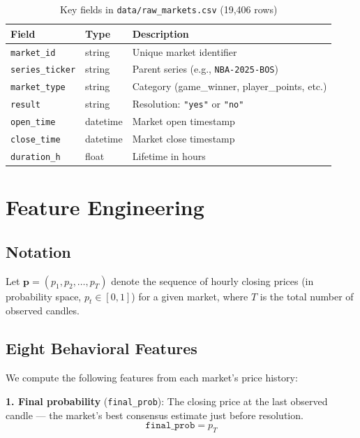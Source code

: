 \documentclass[11pt, a4paper]{article}
\begin{document}
\begin{table}[h!]
\centering
\caption{Key fields in \texttt{data/raw\_markets.csv} (19,406 rows)}
\begin{tabular}{lll}
\toprule
Field & Type & Description \\
\midrule
\texttt{market\_id} & string & Unique market identifier \\
\texttt{series\_ticker} & string & Parent series (e.g., \texttt{NBA-2025-BOS}) \\
\texttt{market\_type} & string & Category (game\_winner, player\_points, etc.) \\
\texttt{result} & string & Resolution: \texttt{"yes"} or \texttt{"no"} \\
\texttt{open\_time} & datetime & Market open timestamp \\
\texttt{close\_time} & datetime & Market close timestamp \\
\texttt{duration\_h} & float & Lifetime in hours \\
\bottomrule
\end{tabular}
\end{table}

\section{Feature Engineering}

\subsection{Notation}
Let $\mathbf{p} = (p_1, p_2, \ldots, p_T)$ denote the sequence of hourly closing prices (in probability space, $p_t \in [0,1]$) for a given market, where $T$ is the total number of observed candles.

\subsection{Eight Behavioral Features}

We compute the following features from each market's price history:

\vspace{0.5em}

\noindent\textbf{1. Final probability} (\texttt{final\_prob}): The closing price at the last observed candle — the market's best consensus estimate just before resolution.
\[
\texttt{final\_prob} = p_T
\]
\end{document}
